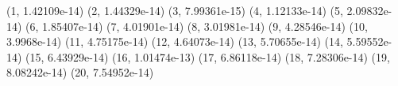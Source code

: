 (1, 1.42109e-14) (2, 1.44329e-14) (3, 7.99361e-15) (4, 1.12133e-14) (5, 2.09832e-14) (6, 1.85407e-14) (7, 4.01901e-14) (8, 3.01981e-14) (9, 4.28546e-14) (10, 3.9968e-14) (11, 4.75175e-14) (12, 4.64073e-14) (13, 5.70655e-14) (14, 5.59552e-14) (15, 6.43929e-14) (16, 1.01474e-13) (17, 6.86118e-14) (18, 7.28306e-14) (19, 8.08242e-14) (20, 7.54952e-14) 